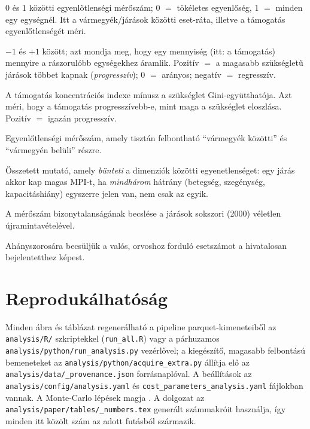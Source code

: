 \documentclass[11pt,a4paper]{article}
\begin{document}
\begin{description}[leftmargin=0pt,style=nextline,nosep]
\item[Gini-együttható] 0 és 1 közötti egyenlőtlenségi mérőszám; 0 $=$ tökéletes
egyenlőség, 1 $=$ minden egy egységnél. Itt a vármegyék/járások közötti
eset-ráta, illetve a támogatás egyenlőtlenségét méri.
\item[Koncentrációs index] $-1$ és $+1$ között; azt mondja meg, hogy egy
mennyiség (itt: a támogatás) mennyire a rászorulóbb egységekhez áramlik.
Pozitív $=$ a magasabb szükségletű járások többet kapnak (\emph{progresszív});
0 $=$ arányos; negatív $=$ regresszív.
\item[Kakwani-index] A támogatás koncentrációs indexe mínusz a szükséglet
Gini-együtthatója. Azt méri, hogy a támogatás progresszívebb-e, mint maga a
szükséglet eloszlása. Pozitív $=$ igazán progresszív.
\item[Theil-index] Egyenlőtlenségi mérőszám, amely tisztán felbontható
\enquote{vármegyék közötti} és \enquote{vármegyén belüli} részre.
\item[Mazziotta--Pareto index (MPI)] Összetett mutató, amely \emph{bünteti}
a dimenziók közötti egyenetlenséget: egy járás akkor kap magas MPI-t, ha
\emph{mindhárom} hátrány (betegség, szegénység, kapacitáshiány) egyszerre
jelen van, nem csak az egyik.
\item[Bootstrap konfidenciaintervallum] A mérőszám bizonytalanságának
becslése a járások sokszori (2000) véletlen újramintavételével.
\item[Aluljelentési szorzó] Ahányszorosára becsüljük a valós, orvoshoz
forduló esetszámot a hivatalosan bejelentetthez képest.
\end{description}

\section*{Reprodukálhatóság}

Minden ábra és táblázat regenerálható a pipeline parquet-kimeneteiből az
\texttt{analysis/R/} szkriptekkel (\texttt{run\_all.R}) vagy a párhuzamos
\texttt{analysis/python/run\_analysis.py} vezérlővel; a kiegészítő,
magasabb felbontású bemeneteket az \texttt{analysis/python/acquire\_extra.py}
állítja elő az \texttt{analysis/data/\_provenance.json} forrásnaplóval. A
beállítások az \texttt{analysis/config/analysis.yaml} és
\texttt{cost\_parameters\_analysis.yaml} fájlokban vannak. A Monte-Carlo
lépések magja \seed. A dolgozat az \texttt{analysis/paper/tables/\_numbers.tex}
generált számmakróit használja, így minden itt közölt szám az adott futásból
származik.



\end{document}
